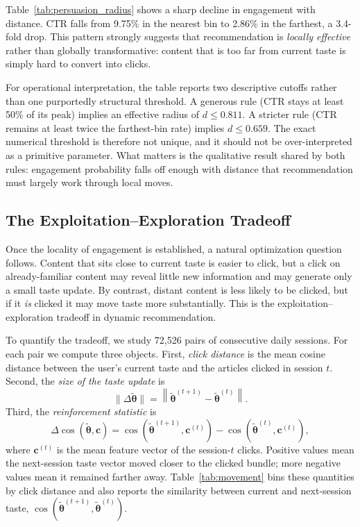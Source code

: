 \documentclass[11pt]{article}
\begin{document}
Table~\ref{tab:persuasion_radius} shows a sharp decline in engagement with distance. CTR falls from 9.75\% in the nearest bin to 2.86\% in the farthest, a 3.4-fold drop. This pattern strongly suggests that recommendation is \emph{locally effective} rather than globally transformative: content that is too far from current taste is simply hard to convert into clicks.

For operational interpretation, the table reports two descriptive cutoffs rather than one purportedly structural threshold. A generous rule (CTR stays at least 50\% of its peak) implies an effective radius of $d \le 0.811$. A stricter rule (CTR remains at least twice the farthest-bin rate) implies $d \le 0.659$. The exact numerical threshold is therefore not unique, and it should not be over-interpreted as a primitive parameter. What matters is the qualitative result shared by both rules: engagement probability falls off enough with distance that recommendation must largely work through local moves.

\subsection{The Exploitation--Exploration Tradeoff}
\label{sec:tradeoff}

Once the locality of engagement is established, a natural optimization question follows. Content that sits close to current taste is easier to click, but a click on already-familiar content may reveal little new information and may generate only a small taste update. By contrast, distant content is less likely to be clicked, but if it \emph{is} clicked it may move taste more substantially. This is the exploitation--exploration tradeoff in dynamic recommendation.

To quantify the tradeoff, we study 72,526 pairs of consecutive daily sessions. For each pair we compute three objects. First, \emph{click distance} is the mean cosine distance between the user's current taste and the articles clicked in session $t$. Second, the \emph{size of the taste update} is
\[
\|\Delta\tilde{\boldsymbol{\theta}}\|
=
\left\|
\tilde{\boldsymbol{\theta}}^{(t+1)}
-
\tilde{\boldsymbol{\theta}}^{(t)}
\right\|.
\]
Third, the \emph{reinforcement statistic} is
\[
\Delta\cos(\tilde{\boldsymbol{\theta}},\mathbf{c})
=
\cos\!\left(\tilde{\boldsymbol{\theta}}^{(t+1)},\mathbf{c}^{(t)}\right)
-
\cos\!\left(\tilde{\boldsymbol{\theta}}^{(t)},\mathbf{c}^{(t)}\right),
\]
where $\mathbf{c}^{(t)}$ is the mean feature vector of the session-$t$ clicks. Positive values mean the next-session taste vector moved closer to the clicked bundle; more negative values mean it remained farther away. Table~\ref{tab:movement} bins these quantities by click distance and also reports the similarity between current and next-session taste, $\cos(\tilde{\boldsymbol{\theta}}^{(t+1)},\tilde{\boldsymbol{\theta}}^{(t)})$.
\end{document}
